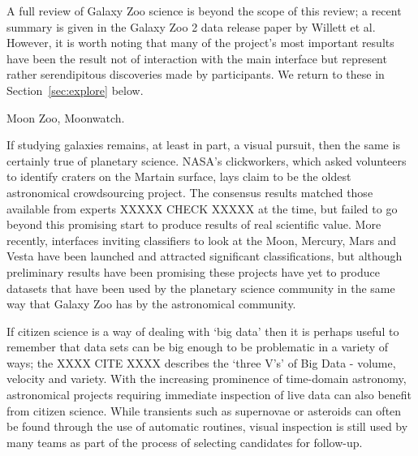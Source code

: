 \documentclass{ar2e}
\begin{document}
A full review of Galaxy Zoo science is beyond the scope of this review; a
recent summary is given in the Galaxy Zoo 2 data release paper by Willett et
al. However, it is worth noting that many of the project's most important
results have been the result not of interaction with the main interface but
represent rather serendipitous discoveries made by participants. We return to
these in Section~\ref{sec:explore} below.



Moon Zoo, Moonwatch.

If studying galaxies remains, at least in part, a visual pursuit, then the
same is certainly true of planetary science. NASA's clickworkers, which asked
volunteers to identify craters on the Martain surface, lays claim to be the
oldest astronomical crowdsourcing project. The consensus results matched those
available from experts XXXXX CHECK XXXXX at the time, but failed to go beyond
this promising start to produce results of real scientific value. More
recently, interfaces inviting classifiers to look at the Moon, Mercury, Mars
and Vesta have been launched and attracted significant classifications, but
although preliminary results have been promising these projects have yet to
produce datasets that have been used by the planetary science community in the
same way that Galaxy Zoo has by the astronomical community. 



If citizen science is a way of dealing with `big data' then it is perhaps
useful to remember that data sets can be big enough to be problematic in a
variety of ways; the XXXX CITE XXXX describes the `three V's' of Big Data -
volume, velocity and variety. With the increasing prominence of time-domain
astronomy, astronomical projects requiring immediate inspection of live data
can also benefit from citizen science. While transients such as supernovae or
asteroids can often be found through the use of automatic routines, visual
inspection is still used by many teams as part of the process of selecting
candidates for follow-up. 
\end{document}
